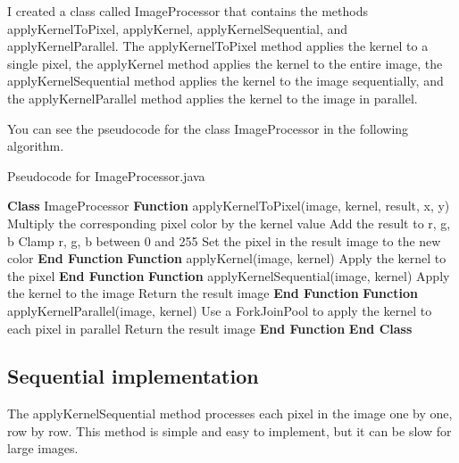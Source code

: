\documentclass{article}
\begin{document}
\begin{multicols}{2}
    I created a class called ImageProcessor that contains the methods applyKernelToPixel, applyKernel, applyKernelSequential, and applyKernelParallel. The applyKernelToPixel method applies the kernel to a single pixel, the applyKernel method applies the kernel to the entire image, the applyKernelSequential method applies the kernel to the image sequentially, and the applyKernelParallel method applies the kernel to the image in parallel.

    You can see the pseudocode for the class ImageProcessor in the following algorithm.

    \begin{algorithm}[H]
        \caption{Pseudocode for ImageProcessor.java}
        \begin{algorithmic}[1]
            \State \textbf{Class} ImageProcessor
            \State \textbf{Function} applyKernelToPixel(image, kernel, result, x, y)
            \State Multiply the corresponding pixel color by the kernel value
            \State Add the result to r, g, b
            \EndFor
            \State Clamp r, g, b between 0 and 255
            \State Set the pixel in the result image to the new color
            \State \textbf{End Function}
            \State
            \State \textbf{Function} applyKernel(image, kernel)
            \State Apply the kernel to the pixel
            \EndFor
            \State \textbf{End Function}
            \State
            \State \textbf{Function} applyKernelSequential(image, kernel)
            \State Apply the kernel to the image
            \State Return the result image
            \State \textbf{End Function}
            \State
            \State \textbf{Function} applyKernelParallel(image, kernel)
            \State Use a ForkJoinPool to apply the kernel to each pixel in parallel
            \State Return the result image
            \State \textbf{End Function}
            \State \textbf{End Class}
        \end{algorithmic}
    \end{algorithm}

    \subsection{Sequential implementation}

    The applyKernelSequential method processes each pixel in the image one by one, row by row. This method is simple and easy to implement, but it can be slow for large images.


\end{multicols}
\end{document}
